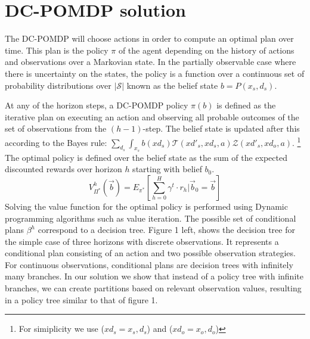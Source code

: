 \documentclass{article} %
\begin{document}
\section{DC-POMDP solution}
The DC-POMDP will choose actions in order to compute an optimal plan over time. This plan is the policy $\pi$ of the agent  depending on the history of actions and observations over a Markovian state. In the partially observable case where there is uncertainty on the states, the policy is a function over a continuous set of probability distributions over $|\mathcal{S}|$ known as the belief state $b = P(x_s,d_s)$.

At any of the horizon steps, a DC-POMDP policy $\pi(b)$ is defined as the iterative plan on executing an action and observing all probable outcomes of the set of observations from the $(h-1)$-step. The belief state is updated after this according to the Bayes rule: $\sum_{d_s}\int_{x_s} b(xd_s)\mathcal{T}(xd'_s,xd_s,a)\mathcal{Z}(xd'_s,xd_o,a)$. \footnote{For simiplicity we use ($xd_s = x_s,d_s$) and ($xd_o=x_o,d_o$)}
The optimal policy is defined over the belief state as the sum of the expected discounted rewards over horizon $h$ starting with belief $b_0$.
{\footnotesize
\begin{equation}
V^h_{\Pi^*}(\vec{b}) = E_{\pi^*} \left[ \sum_{h=0}^{H} \gamma^t \cdot r_h \Big| \vec{b}_0 = \vec{b} \right]\nonumber
\end{equation}
}
Solving the value function for the optimal policy is performed using Dynamic programming algorithms such as value iteration. 
The possible set of conditional plans $\beta^h$ correspond to a decision tree. Figure 1 left, shows the decision tree for the simple case of three horizons with discrete observations. It represents a conditional plan consisting of an action and two possible observation strategies. For continuous observations, conditional plans are decision trees with infinitely many branches. In our solution we show that instead of a policy tree with infinite branches, we can create partitions based on relevant observation values, resulting in a policy tree similar to that of figure 1.%
\incmargin{.5em}
\linesnumbered
\end{document}
